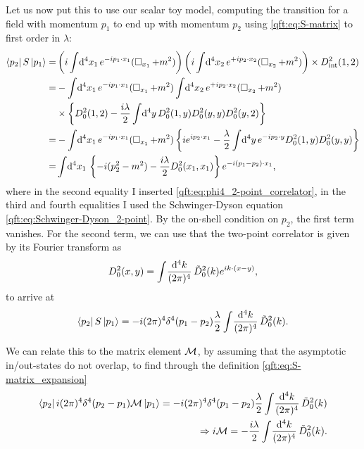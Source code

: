 \documentclass[../main.tex]{subfiles}
\begin{document}
Let us now put this to use our scalar toy model, computing the transition for a field with momentum \(p_1\) to end up with momentum \(p_2\) using \cref{qft:eq:S-matrix} to first order in \(\lambda\):
\begin{align}
  \nonumber
  \bra{p_2} S \ket{p_1} = & \pclosed{i\integral{^4x_1} \exp{-ip_1 \cdot x_1} (\dA_{x_1} + m^2)} \pclosed{ i \integral{^4x_2} \exp{+ip_2 \cdot x_2} (\dA_{x_2} + m^2)} \times D_{\text{int}}^2(1, 2) \\
  \nonumber
  =                       & -\integral{^4x_1} \exp{-ip_1 \cdot x_1} (\dA_{x_1} + m^2) \integral{^4x_2} \exp{+ip_2 \cdot x_2} (\dA_{x_2} + m^2)                                                      \\
  \nonumber
                          & \times \cclosed{D_0^2(1,2) - \frac{i\lambda}{2} \integral{^4y} D_0^2(1,y)D_0^2(y,y) D_0^2(y,2)}                                                                         \\
  \nonumber
  =                       & -\integral{^4x_1} \exp{-ip_1 \cdot x_1} (\dA_{x_1} + m^2) \cclosed{i \exp{ip_2\cdot x_1} - \frac{\lambda}{2}\integral{^4y} \exp{-ip_2\cdot y} D_0^2(1,y) D_0^2(y,y)}    \\
  =                       & \integral{^4x_1} \cclosed{-i (p^2_2 - m^2)- \frac{i\lambda}{2} D_0^2(x_1,x_1)} \exp{-i(p_1-p_2) \cdot x_1},
\end{align}
where in the second equality I inserted \cref{qft:eq:phi4_2-point_correlator}, in the third and fourth equalities I used the Schwinger-Dyson equation \cref{qft:eq:Schwinger-Dyson_2-point}.
By the on-shell condition on \(p_2\), the first term vanishes.
For the second term, we can use that the two-point correlator is given by its Fourier transform as
\begin{equation}
  D_0^2(x,y) = \int\!\frac{\mathrm{d}^{4}k}{(2\pi)^{4}}\, \tilde{D}_0^2(k) e^{ik\cdot(x-y)},
\end{equation}
to arrive at
\begin{equation}
  \left\langle p_2 \right| S \left| p_1 \right\rangle = -i(2\pi)^4 \delta^4(p_1 - p_2) \frac{\lambda}{2} \int\!\frac{\mathrm{d}^{4}k}{(2\pi)^{4}}\, \tilde{D}_0^2(k).
\end{equation}

We can relate this to the matrix element \(\mathcal{M}\), by assuming that the asymptotic in/out-states do not overlap, to find through the definition \cref{qft:eq:S-matrix_expansion}
\begin{align}
  \nonumber
  \left\langle p_2 \right| i(2\pi)^4 \delta^4(p_2-p_1) \mathcal{M} \left| p_1 \right\rangle = -i(2\pi)^4 \delta^4(p_1 - p_2) \frac{\lambda}{2} \int\!\frac{\mathrm{d}^{4}k}{(2\pi)^{4}}\, \tilde{D}_0^2(k) \\
  \Rightarrow i\mathcal{M} = - \frac{i \lambda}{2} \int\!\frac{\mathrm{d}^{4}k}{(2\pi)^{4}}\, \tilde{D}_0^2(k).
\end{align}
\end{document}

